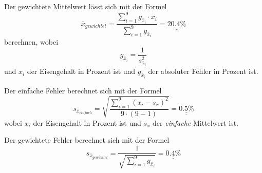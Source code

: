 Der gewichtete Mittelwert l\"asst sich mit der Formel
\[ \bar{x}_{gewichtet} = \frac{ \sum_{i=1}^{9} g_{\bar{x}_i} \cdot x_i}{ \sum_{i=1}^{9} g_{\bar{x}_i}} = \underline{\underline{20.4 \textrm{\%}}} \]
berechnen, wobei
\[ g_{\bar{x}_i} = \frac{1}{s_{\bar{x}_i}^2} \]
und $x_i$ der Eisengehalt in Prozent ist und $g_{\bar{x}_i}$ der absoluter Fehler in Prozent ist.

Der einfache Fehler berechnet sich mit der Formel
\[ s_{\bar{x}_{einfach}} = \sqrt{ \frac{ \sum_{i=1}^{9} (x_i - s_{\bar{x}})^2}{ 9 \cdot (9-1) }} = \underline{\underline{0.5 \textrm{\%}}} \]
wobei $x_i$ der Eisengehalt in Prozent ist und $s_{\bar{x}}$ der \emph{einfache} Mittelwert ist.

Der gewichtete Fehler berechnet sich mit der Formel
\[ s_{\bar{x}_{gewichtet}} = \frac{1}{ \sqrt{ \sum_{i=1}^{9} g_{\bar{x}_i} } } = \underline{\underline{0.4 \textrm{\%}}}  \]

